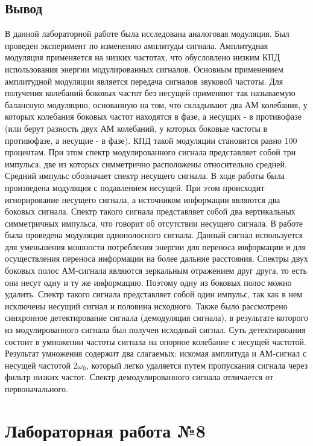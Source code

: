 \documentclass[10pt,a4paper]{report}
\begin{document}
\section{Вывод}
В данной лабораторной работе была исследована аналоговая модуляция. Был проведен эксперимент по изменению амплитуды сигнала.
Амплитудная модуляция применяется на низких частотах, что обусловлено низким КПД использования энергии модулированных сигналов.
Основным применением амплитудной модуляции является передача сигналов звуковой частоты. Для получения колебаний боковых частот без несущей применяют так называемую 
балансную модуляцию, основанную на том, что складывают два АМ колебания, у которых колебания боковых частот находятся в фазе, а несущих - в противофазе
 (или берут разность двух АМ колебаний, у которых боковые частоты в противофазе, а несущие - в фазе). КПД такой модуляции становится равно 100 процентам.
При этом спектр модулированного сигнала представляет собой три импульса, две из которых симметрично расположены относительно средней. Средний импульс обозначает 
спектр несущего сигнала.
В ходе работы была произведена модуляция с подавлением несущей.
При этом происходит игнорирование несущего сигнала, а источником информации являются два боковых сигнала. Спектр такого сигнала представляет собой два 
вертикальных симметричных импульса, что говорит об отсутствии несущего сигнала.
В работе была проведена модуляция однополосного сигнала. Данный сигнал используется для  уменьшения мошности потребления энергии для переноса информации и 
для осуществления переноса информации на более дальние расстояния. Спектры двух боковых полос АМ-сигнала являются зеркальным отражением друг друга, то есть они 
несут одну и ту же информацию. Поэтому одну из боковых полос можно удалить. Спектр такого сигнала представляет собой один импульс, так как в нем исключены несущий 
сигнал и половина исходного. 
Также было рассмотрено синхронное детектирование сигнала (демодуляция сигнала), в результате которого из модулированного 
сигнала был получен исходный сигнал. Суть детектирвоания состоит в умножении частоты сигнала на опорное колебание с несущей частотой. Результат умножения содержит 
два слагаемых: искомая амплитуда и АМ-сигнал с несущей частотой 2$\omega_0$, который легко удаляется путем пропускания сигнала через фильтр низких частот.
Спектр демодулированного сигнала отличается от первоначального. 
\chapter{Лабораторная работа №8}
\end{document}
